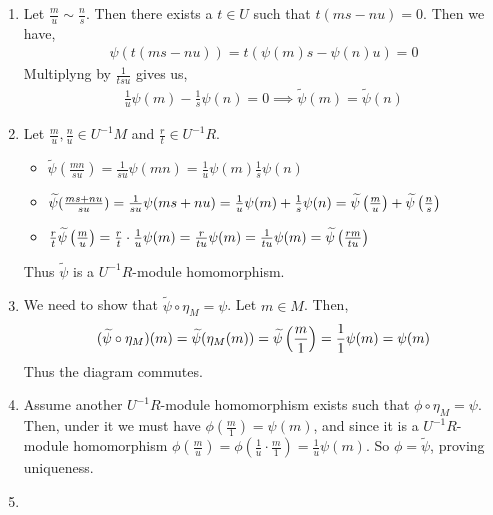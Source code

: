 \documentclass[Notebook.tex]{subfiles}
\begin{document}
\begin{solution}
	\bbni
	\begin{enumerate}
		\item Let $\frac{m}{u} \sim \frac{n}{s}$. Then there exists a $t \in U$ such that $t(ms - nu) = 0$. Then we have, 
		\begin{align*}
			\psi(t(ms - nu)) = t(\psi(m)s - \psi(n)u) = 0
		\end{align*}
		Multiplyng by $\frac{1}{tsu}$ gives us, 
		\begin{align*}
			 \frac{1}{u}\psi(m) - \frac{1}{s}\psi(n) = 0 \implies \widetilde{\psi}(m) = \widetilde{\psi}(n)
		\end{align*}


		\item Let $\frac{m}{u}, \frac{n}{u} \in U^{-1}M$ and $\frac{r}{t} \in U^{-1}R$. 
		
		\begin{itemize}
			\item $\widetilde{\psi}(\frac{mn}{su}) = \frac{1}{su}\psi(mn) = \frac{1}{u} \psi(m) \frac{1}{s} \psi(n)$
			\item $\widetilde{\psi}(\frac{ms + nu}{su}) = \frac{1}{su}\psi(ms + nu) = \frac{1}{u} \psi(m) + \frac{1}{s} \psi(n) = \widetilde{\psi}\left(\frac{m}{u}\right) + \widetilde{\psi}\left(\frac{n}{s}\right)$
			\item $\frac{r}{t}\widetilde{\psi} \left(\frac{m}{u}\right) = \frac{r}{t} \cdot \frac{1}{u}  \psi{(m)} = \frac{r}{tu}  \psi{(m)} = \frac{1}{tu} \psi(m) =\widetilde{\psi}\left(\frac{rm}{tu}\right)$
		\end{itemize}

		Thus $\widetilde{\psi}$ is a $U^{-1}R$-module homomorphism. 

		\item We need to show that $\widetilde{\psi} \circ \eta_M = \psi$. Let $m \in M$. Then, 
		\begin{align*}
			(\widetilde{\psi} \circ \eta_M) (m) = \widetilde{\psi} ( \eta_M(m))  = \widetilde{\psi}\left(\frac{m}{1}\right) = \frac{1}{1}\psi(m) = \psi(m)
		\end{align*}
		Thus the diagram commutes. 

		\item Assume another $U^{-1}R$-module homomorphism exists such that $\phi \circ \eta_M = \psi$. Then, under it we must have $\phi(\frac{m}{1}) = \psi(m)$, and since it is a $U^{-1}R$-module homomorphism $\phi(\frac{m}{u}) = \phi(\frac{1}{u} \cdot \frac{m}{1}) = \frac{1}{u}\psi(m)$. So $\phi = \widetilde{\psi}$, proving uniqueness.
		
		\item \todo{}
	\end{enumerate}
\end{solution}
\end{document}
